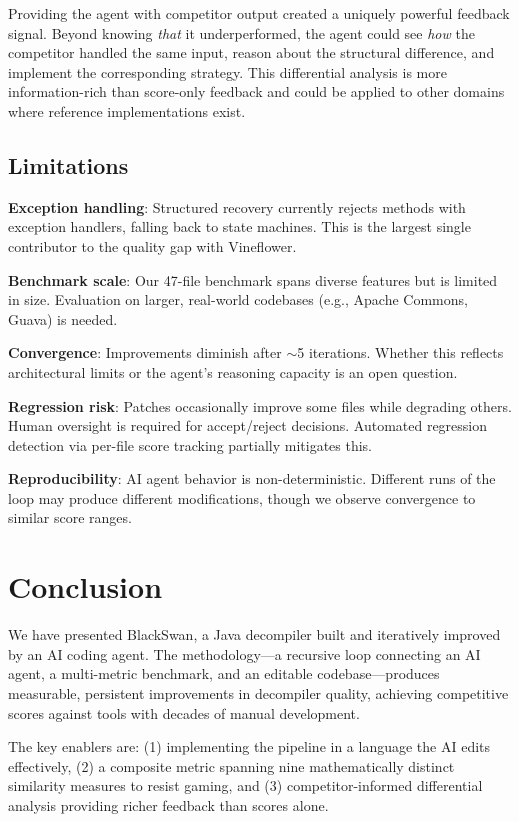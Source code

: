 \documentclass[conference,11pt]{IEEEtran}
\begin{document}
Providing the agent with competitor output created a uniquely powerful feedback signal. Beyond knowing \emph{that} it underperformed, the agent could see \emph{how} the competitor handled the same input, reason about the structural difference, and implement the corresponding strategy. This differential analysis is more information-rich than score-only feedback and could be applied to other domains where reference implementations exist.

\subsection{Limitations}

\textbf{Exception handling}: Structured recovery currently rejects methods with exception handlers, falling back to state machines. This is the largest single contributor to the quality gap with Vineflower.

\textbf{Benchmark scale}: Our 47-file benchmark spans diverse features but is limited in size. Evaluation on larger, real-world codebases (e.g., Apache Commons, Guava) is needed.

\textbf{Convergence}: Improvements diminish after ${\sim}$5 iterations. Whether this reflects architectural limits or the agent's reasoning capacity is an open question.

\textbf{Regression risk}: Patches occasionally improve some files while degrading others. Human oversight is required for accept/reject decisions. Automated regression detection via per-file score tracking partially mitigates this.

\textbf{Reproducibility}: AI agent behavior is non-deterministic. Different runs of the loop may produce different modifications, though we observe convergence to similar score ranges.

\section{Conclusion}
\label{sec:conclusion}

We have presented BlackSwan, a Java decompiler built and iteratively improved by an AI coding agent. The methodology---a recursive loop connecting an AI agent, a multi-metric benchmark, and an editable codebase---produces measurable, persistent improvements in decompiler quality, achieving competitive scores against tools with decades of manual development.

The key enablers are: (1) implementing the pipeline in a language the AI edits effectively, (2) a composite metric spanning nine mathematically distinct similarity measures to resist gaming, and (3) competitor-informed differential analysis providing richer feedback than scores alone.
\end{document}

